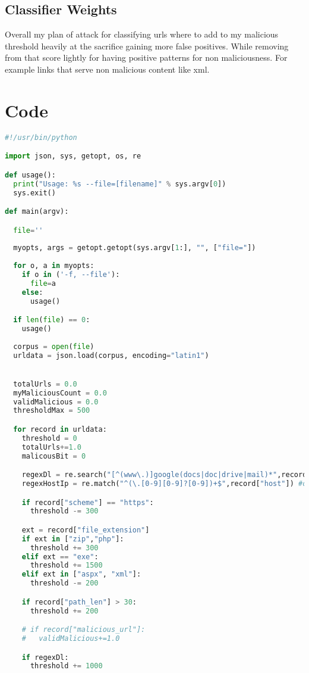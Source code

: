 \documentclass[letterpaper,12pt,titlepage,onecolumn]{IEEEtran}
\begin{document}
\subsection{Classifier Weights}
Overall my plan of attack for classifying urls where to add to my malicious threshold heavily at the sacrifice gaining more false positives. While removing from that score lightly for having positive patterns for non maliciousness. For example links that serve non malicious content like xml.

\section{Code}
\begin{lstlisting}[language=Python]
#!/usr/bin/python

import json, sys, getopt, os, re

def usage():
  print("Usage: %s --file=[filename]" % sys.argv[0])
  sys.exit()

def main(argv):

  file=''
 
  myopts, args = getopt.getopt(sys.argv[1:], "", ["file="])
 
  for o, a in myopts:
    if o in ('-f, --file'):
      file=a
    else:
      usage()

  if len(file) == 0:
    usage()
 
  corpus = open(file)
  urldata = json.load(corpus, encoding="latin1")


  totalUrls = 0.0
  myMaliciousCount = 0.0
  validMalicious = 0.0
  thresholdMax = 500

  for record in urldata:
    threshold = 0
    totalUrls+=1.0
    malicousBit = 0

    regexDl = re.search("[^(www\.)]google(docs|doc|drive|mail)*",record["url"]) #some variation of google followed by doc or drive
    regexHostIp = re.match("^(\.[0-9][0-9]?[0-9])+$",record["host"]) #only ip host

    if record["scheme"] == "https":
      threshold -= 300

    ext = record["file_extension"]
    if ext in ["zip","php"]:
      threshold += 300
    elif ext == "exe":
      threshold += 1500
    elif ext in ["aspx", "xml"]:
      threshold -= 200

    if record["path_len"] > 30:
      threshold += 200

    # if record["malicious_url"]:
    #   validMalicious+=1.0

    if regexDl:
      threshold += 1000


\end{lstlisting}
\end{document}
